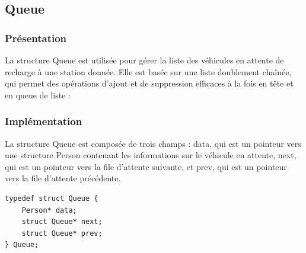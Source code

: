 \documentclass[french,a4paper]{article}
\begin{document}
\subsection{Queue}

\subsubsection{Présentation}
La structure Queue est utilisée pour gérer la liste des véhicules en attente de recharge à une station donnée. Elle est basée sur une liste doublement chaînée, qui permet des opérations d'ajout et de suppression efficaces à la fois en tête et en queue de liste :

\begin{center}
\end{center}

\subsubsection{Implémentation}
La structure Queue est composée de trois champs : data, qui est un pointeur vers une structure Person contenant les informations sur le véhicule en attente, next, qui est un pointeur vers la file d'attente suivante, et prev, qui est un pointeur vers la file d'attente précédente. \\

\begin{center}
    \begin{lstlisting}[caption=Structure Queue]
typedef struct Queue {
    Person* data;
    struct Queue* next;
    struct Queue* prev;
} Queue;
    \end{lstlisting}
\end{center}
\end{document}
